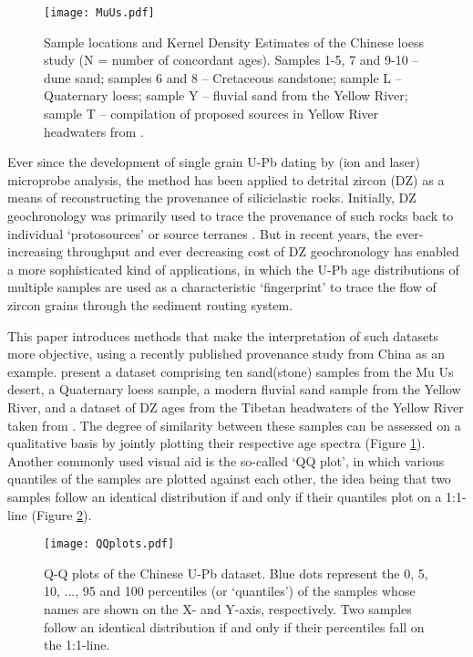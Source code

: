 \documentclass[authoryear,preprint,review,12pt]{elsarticle}
\begin{document}
\begin{figure}
\texttt{[image: MuUs.pdf]}
\caption{Sample locations and Kernel Density Estimates
  \citep[KDEs,][]{vermeesch2012b} of the Chinese loess study (N =
  number of concordant ages). Samples 1-5, 7 and 9-10 -- dune sand;
  samples 6 and 8 -- Cretaceous sandstone; sample L -- Quaternary
  loess; sample Y -- fluvial sand from the Yellow River; sample T --
  compilation of proposed sources in Yellow River headwaters from
  \citet{pullen2011}.}
\label{fig:mu-us}
\end{figure}

Ever since the development of single grain U-Pb dating by (ion and
laser) microprobe analysis, the method has been applied to detrital
zircon (DZ) as a means of reconstructing the provenance of
siliciclastic rocks.  Initially, DZ geochronology was primarily used
to trace the provenance of such rocks back to individual
`protosources' or source terranes \citep{gehrels1995, pell1997}. But
in recent years, the ever-increasing throughput and ever decreasing
cost of DZ geochronology has enabled a more sophisticated kind of
applications, in which the U-Pb age distributions of multiple samples
are used as a characteristic `fingerprint' to trace the flow of zircon
grains through the sediment routing system.

This paper introduces methods that make the interpretation of such
datasets more objective, using a recently published provenance study
from China as an example. \citet{stevens2012} present a dataset
comprising ten sand(stone) samples from the Mu Us desert, a Quaternary
loess sample, a modern fluvial sand sample from the Yellow River, and
a dataset of DZ ages from the Tibetan headwaters of the Yellow River
taken from \citet{pullen2011}.  The degree of similarity between these
samples can be assessed on a qualitative basis by jointly plotting
their respective age spectra (Figure \ref{fig:mu-us}). Another
commonly used visual aid is the so-called `QQ plot', in which various
quantiles of the samples are plotted against each other, the idea
being that two samples follow an identical distribution if and only if
their quantiles plot on a 1:1-line (Figure \ref{fig:QQ}).  

\begin{figure}
\texttt{[image: QQplots.pdf]}
\caption{Q-Q plots of the Chinese U-Pb dataset. Blue dots represent
  the 0, 5, 10, ..., 95 and 100 percentiles (or `quantiles') of the
  samples whose names are shown on the X- and Y-axis, respectively.
  Two samples follow an identical distribution if and only if their
  percentiles fall on the 1:1-line.}
\label{fig:QQ}
\end{figure}
\end{document}
